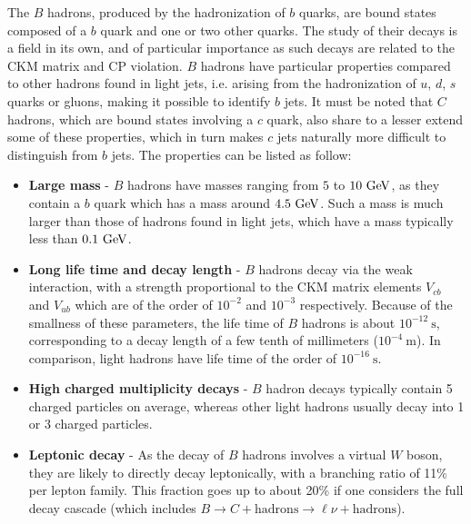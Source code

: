     The $B$ hadrons, produced by the hadronization of $b$ quarks, are bound states composed
    of a $b$ quark and one or two other quarks. The study of their decays is
    a field in its own, and of particular importance as such decays are related to the
    CKM matrix and CP violation. $B$ hadrons have particular properties compared to other hadrons
    found in light jets, i.e. arising from the hadronization of $u$, $d$, $s$ quarks or
    gluons, making it possible to identify $b$ jets. It must be noted that $C$ hadrons,
    which are bound states involving a $c$ quark, also share to a lesser extend some of these
    properties, which in turn makes $c$ jets naturally more difficult to distinguish
    from $b$ jets. The properties can be listed as follow:
    \begin{itemize}
        \item \textbf{Large mass} - $B$ hadrons have masses ranging from $5$ to $10~\text{GeV}$, as
              they contain a $b$ quark which has a mass around $4.5~\text{GeV}$. Such a mass is
              much larger than those of hadrons found in light jets, which have a mass
              typically less than $0.1~\text{GeV}$.
        \item \textbf{Long life time and decay length} - $B$ hadrons decay via the weak
              interaction, with a strength proportional to the CKM matrix elements $V_{cb}$ and $V_{ub}$
              which are of the order of $10^{-2}$ and $10^{-3}$ respectively. Because of
              the smallness of these parameters, the life time of $B$ hadrons is about
              $10^{-12}~\text{s}$, corresponding to a decay length of a few tenth of millimeters
              ($10^{-4}~\text{m}$). In comparison, light hadrons have life time of the order
              of $10^{-16}~\text{s}$.
        \item \textbf{High charged multiplicity decays} - $B$ hadron decays typically
              contain 5 charged particles on average, whereas other light hadrons
              usually decay into 1 or 3 charged particles.
        \item \textbf{Leptonic decay} - As the decay of $B$ hadrons involves a virtual $W$ boson,
              they are likely to directly decay leptonically, with a branching ratio of
              11\% per lepton family. This fraction goes up to about 20\% if one
              considers the full decay cascade (which includes $B \rightarrow C +
              \text{hadrons} \rightarrow \ell\nu + \text{hadrons}$).
    \end{itemize}

